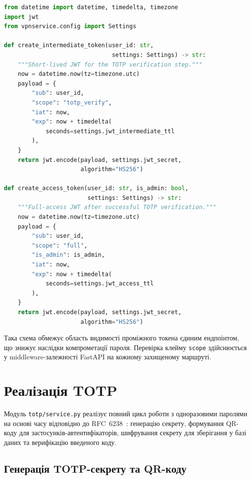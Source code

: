 \begin{lstlisting}[style=mystyle, language=Python,
  caption={Генерація JWT-токенів (проміжного та доступу)},
  label={lst:jwt_tokens}]
from datetime import datetime, timedelta, timezone
import jwt
from vpnservice.config import Settings

def create_intermediate_token(user_id: str,
                               settings: Settings) -> str:
    """Short-lived JWT for the TOTP verification step."""
    now = datetime.now(tz=timezone.utc)
    payload = {
        "sub": user_id,
        "scope": "totp_verify",
        "iat": now,
        "exp": now + timedelta(
            seconds=settings.jwt_intermediate_ttl
        ),
    }
    return jwt.encode(payload, settings.jwt_secret,
                      algorithm="HS256")

def create_access_token(user_id: str, is_admin: bool,
                        settings: Settings) -> str:
    """Full-access JWT after successful TOTP verification."""
    now = datetime.now(tz=timezone.utc)
    payload = {
        "sub": user_id,
        "scope": "full",
        "is_admin": is_admin,
        "iat": now,
        "exp": now + timedelta(
            seconds=settings.jwt_access_ttl
        ),
    }
    return jwt.encode(payload, settings.jwt_secret,
                      algorithm="HS256")
\end{lstlisting}

Така схема обмежує область видимості проміжного токена єдиним ендпоінтом,
що знижує наслідки компрометації пароля. Перевірка клейму \texttt{scope}
здійснюється у middleware-залежності FastAPI на кожному захищеному маршруті.

\section{Реалізація TOTP}
\label{sec:totp_implementation}

Модуль \texttt{totp/service.py} реалізує повний цикл роботи з одноразовими
паролями на основі часу відповідно до RFC~6238~\cite{rfc6238}: генерацію
секрету, формування QR-коду для застосунків-автентифікаторів, шифрування
секрету для зберігання у базі даних та верифікацію введеного коду.

\subsection{Генерація TOTP-секрету та QR-коду}

